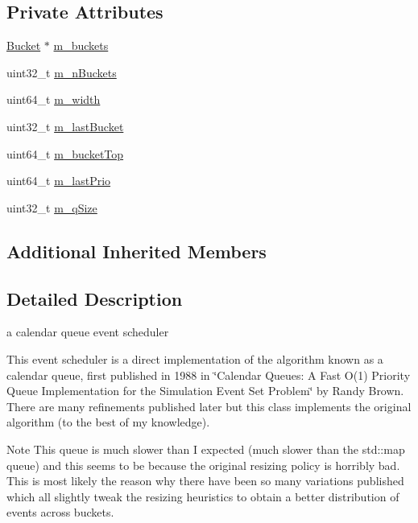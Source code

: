 \subsection*{Private Attributes}
\begin{DoxyCompactItemize}
\item 
\hyperlink{classns3_1_1CalendarScheduler_a92e721d4162831c1f0c386034930c967}{Bucket} $\ast$ \hyperlink{classns3_1_1CalendarScheduler_ad022479890e917ef6a64ef814284033e}{m\+\_\+buckets}
\item 
uint32\+\_\+t \hyperlink{classns3_1_1CalendarScheduler_a0bbeaf47c899cb8f2cf9e17387014f3f}{m\+\_\+n\+Buckets}
\item 
uint64\+\_\+t \hyperlink{classns3_1_1CalendarScheduler_acbe04fc4f382aa5759beb2dc1cdc0523}{m\+\_\+width}
\item 
uint32\+\_\+t \hyperlink{classns3_1_1CalendarScheduler_aac53aae4bda7758ba73e45bfe775fec0}{m\+\_\+last\+Bucket}
\item 
uint64\+\_\+t \hyperlink{classns3_1_1CalendarScheduler_a8a8746e4fc94345c5584629b78b25549}{m\+\_\+bucket\+Top}
\item 
uint64\+\_\+t \hyperlink{classns3_1_1CalendarScheduler_ac0e4ff83ceeb795f92af7a52d48ec41b}{m\+\_\+last\+Prio}
\item 
uint32\+\_\+t \hyperlink{classns3_1_1CalendarScheduler_a24148e8feac3c068ab31317aee8f46c2}{m\+\_\+q\+Size}
\end{DoxyCompactItemize}
\subsection*{Additional Inherited Members}


\subsection{Detailed Description}
a calendar queue event scheduler 

This event scheduler is a direct implementation of the algorithm known as a calendar queue, first published in 1988 in \char`\"{}\+Calendar Queues\+: A Fast O(1) Priority Queue Implementation for
the Simulation Event Set Problem\char`\"{} by Randy Brown. There are many refinements published later but this class implements the original algorithm (to the best of my knowledge).

\begin{DoxyNote}{Note}
This queue is much slower than I expected (much slower than the std\+::map queue) and this seems to be because the original resizing policy is horribly bad. This is most likely the reason why there have been so many variations published which all slightly tweak the resizing heuristics to obtain a better distribution of events across buckets. 
\end{DoxyNote}


